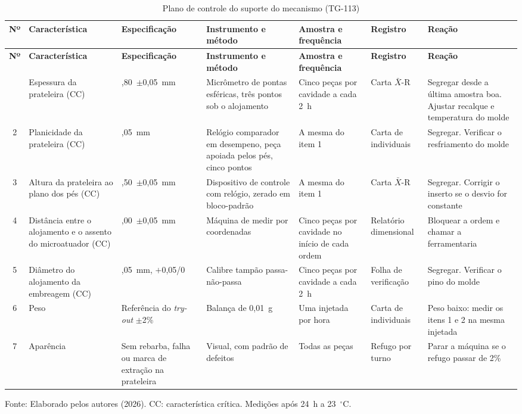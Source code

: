 \begin{landscape}
\begingroup
\footnotesize
\renewcommand{\arraystretch}{1.25}
\begin{longtable}{@{}
    c
    >{\RaggedRight\arraybackslash}p{3.4cm}
    >{\RaggedRight\arraybackslash}p{2.4cm}
    >{\RaggedRight\arraybackslash}p{5.0cm}
    >{\RaggedRight\arraybackslash}p{3.6cm}
    >{\RaggedRight\arraybackslash}p{2.4cm}
    >{\RaggedRight\arraybackslash}p{4.4cm}@{}}
    \caption{Plano de controle do suporte do mecanismo (TG-113)}\label{tab:ctrl_plano}\\
    \toprule
    \textbf{Nº} & \textbf{Característica} & \textbf{Especificação} & \textbf{Instrumento e método} & \textbf{Amostra e frequência} & \textbf{Registro} & \textbf{Reação} \\
    \midrule
    \endfirsthead
    \toprule
    \textbf{Nº} & \textbf{Característica} & \textbf{Especificação} & \textbf{Instrumento e método} & \textbf{Amostra e frequência} & \textbf{Registro} & \textbf{Reação} \\
    \midrule
    \endhead
    \bottomrule
    \endfoot
    1 & Espessura da prateleira (CC) & 0,80~$\pm$0,05~mm & Micrômetro de pontas esféricas, três pontos sob o alojamento & Cinco peças por cavidade a cada 2~h & Carta $\bar{X}$-R & Segregar desde a última amostra boa. Ajustar recalque e temperatura do molde \\
    2 & Planicidade da prateleira (CC) & 0,05~mm & Relógio comparador em desempeno, peça apoiada pelos pés, cinco pontos & A mesma do item 1 & Carta de individuais & Segregar. Verificar o resfriamento do molde \\
    3 & Altura da prateleira ao plano dos pés (CC) & 14,50~$\pm$0,05~mm & Dispositivo de controle com relógio, zerado em bloco-padrão & A mesma do item 1 & Carta $\bar{X}$-R & Segregar. Corrigir o inserto se o desvio for constante \\
    4 & Distância entre o alojamento e o assento do microatuador (CC) & 16,00~$\pm$0,05~mm & Máquina de medir por coordenadas & Cinco peças por cavidade no início de cada ordem & Relatório dimensional & Bloquear a ordem e chamar a ferramentaria \\
    5 & Diâmetro do alojamento da embreagem (CC) & 13,05~mm, $+$0,05/0 & Calibre tampão passa-não-passa & Cinco peças por cavidade a cada 2~h & Folha de verificação & Segregar. Verificar o pino do molde \\
    6 & Peso & Referência do \textit{try-out} $\pm$2\% & Balança de 0,01~g & Uma injetada por hora & Carta de individuais & Peso baixo: medir os itens 1 e 2 na mesma injetada \\
    7 & Aparência & Sem rebarba, falha ou marca de extração na prateleira & Visual, com padrão de defeitos & Todas as peças & Refugo por turno & Parar a máquina se o refugo passar de 2\% \\
\end{longtable}
\endgroup
\begin{center}
    \footnotesize Fonte: Elaborado pelos autores (2026). CC: característica crítica. Medições após 24~h a 23~$^\circ$C.
\end{center}
\end{landscape}


